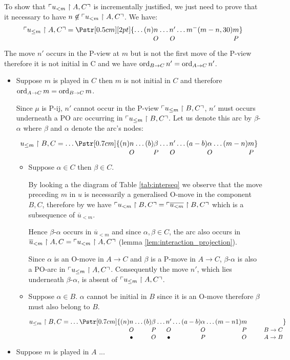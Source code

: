 To show that $\ulcorner u_{<m} \upharpoonright A,C \urcorner$ is incrementally justified, we just
need to prove that it necessary to have $n\not\in \ulcorner u_{<m} \upharpoonright A,C \urcorner$. We have:
$$ \pview{u_{\leq m} \filter A,C} =  
\Pstr[0.5cm][2pt]{ \ldots (n){\stk {n} O}  \ldots
 {\stk {n'} O}  \ldots m^- (m-n,30){\stk m P}
}
$$

The move $n'$ occurs in the P-view at $m$ but is not the first
move of the P-view therefore it is not initial in C and we have $\mathop{\mathrm{ord}}_{B\rightarrow C}{n'} = \mathop{\mathrm{ord}}_{A\rightarrow C} {n'}$.

\begin{itemize}
\item Suppose $m$ is played in $C$ then $m$ is not initial in $C$ and therefore
$\mathop{\mathrm{ord}}_{A\rightarrow C}{m} = \mathop{\mathrm{ord}}_{B \rightarrow C}{m}$.

Since $\mu$ is P-ij, $n'$ cannot occur in the P-view $\ulcorner u_{\leq m} \upharpoonright B,C \urcorner$, $n'$ must occurs underneath a PO arc occurring in $\ulcorner u_{\leq m} \upharpoonright B,C \urcorner$. Let us denote this arc by $\beta$-$
\alpha$ where $\beta$ and $\alpha$ denote the arc's nodes:

$$ u_{\leq m} \filter B,C = \ldots  
\Pstr[0.7cm]{
 (n){\stk{n} O } \ldots (b){\stk\beta P} \ldots \stk{n'} O  
\ldots (a-b){\stk\alpha O}  \ldots (m-n){\stk m  P }
} 
$$

\begin{itemize}
\item Suppose $\alpha \in C$ then $\beta\in C$.

By looking a the diagram of Table \ref{tab:interseq} we observe that the move preceding $m$ in $u$ is necessarily a generalised O-move in the component $B,C$, therefore by \cite[Lemma 3.3.1]{Harmer2005}
we have $\ulcorner u_{<m} \upharpoonright B,C \urcorner = \ulcorner \overline{u_{<m}} \upharpoonright B,C \urcorner$ which is a subsequence of $\overline{u}_{<m}$.

Hence $\beta$-$\alpha$ occurs in $\overline{u}_{<m}$ and since $\alpha,\beta \in C$, the arc also occurs in
$\overline{u}_{<m} \upharpoonright A,C = \ulcorner u_{<m} \upharpoonright A,C \urcorner$ (lemma \ref{lem:interaction_projection}).

Since $\alpha$ is an O-move in $A\rightarrow C$ and $\beta$ is a P-move in $A\rightarrow C$, $\beta$-$\alpha$ is also a PO-arc 
in $\ulcorner u_{\leq m} \upharpoonright A,C \urcorner$. Consequently
the move $n'$, which lies  underneath $\beta$-$\alpha$, is absent of $\ulcorner u_{\leq m} \upharpoonright A,C \urcorner$.


\item Suppose $\alpha \in B$. $\alpha$ cannot be initial in $B$ since it is an O-move therefore $\beta$ must also belong to $B$.

$$ u_{\leq m} \filter B,C = \ldots 
\Pstr[0.7cm]{
 (n){\stkt{n} O \bullet} \ldots (b){\stkt\beta P O} \ldots \stkt{n'} O \bullet
\ldots (a-b){\stkt\alpha O P}  \ldots (m-n1){\stkt m  P O} 
\qquad\qquad\stkt{}{B\rightarrow C}{A \rightarrow B}
} 
$$


\end{itemize}

\item Suppose $m$ is played in $A$ ...
\end{itemize} 




